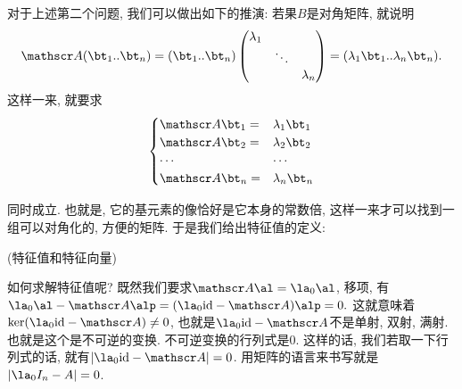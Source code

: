对于上述第二个问题, 我们可以做出如下的推演: 若果$B$是对角矩阵, 就说明
\[
\huaa(\bt_{1}..\bt_{n})=(\bt_{1}..\bt_{n})\begin{pmatrix}\lambda_{1}\\
 & \ddots\\
 &  & \lambda_{n}
\end{pmatrix}=(\lambda_{1}\bt_{1}..\lambda_{n}\bt_{n}).
\]
 这样一来, 就要求
\[
\begin{cases}
\huaa\bt_{1}= & \lambda_{1}\bt_{1}\\
\huaa\bt_{2}= & \lambda_{2}\bt_{2}\\
\cdots & \cdots\\
\huaa\bt_{n}= & \lambda_{n}\bt_{n}
\end{cases}
\]

同时成立. 也就是, 它的基元素的像恰好是它本身的常数倍, 这样一来才可以找到一组可以对角化的, 方便的矩阵. 于是我们给出特征值的定义: 
\begin{defn}
(特征值和特征向量)
\end{defn}
如何求解特征值呢? 既然我们要求$\huaa\al=\la_{0}\al$, 移项, 有$\la_{0}\al-\huaa\alp=(\la_{0}\id-\huaa)\alp=0.$
这就意味着$\ker(\la_{0}\id-\huaa)\neq0$, 也就是$\la_{0}\id-\huaa$不是单射, 双射,
满射. 也就是这个是不可逆的变换. 不可逆变换的行列式是0. 这样的话, 我们若取一下行列式的话, 就有$|\la_{0}\id-\huaa|=0$.
用矩阵的语言来书写就是$|\la_{0}I_{n}-A|=0$.

